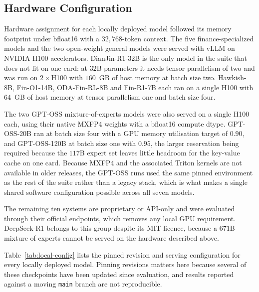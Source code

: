 
\subsection{Hardware Configuration}
\label{app:hardware}

Hardware assignment for each locally deployed model followed its memory footprint under
bfloat16 with a $32{,}768$-token context. The five finance-specialized models and the two
open-weight general models were served with vLLM on NVIDIA H100 accelerators.
DianJin-R1-32B is the only model in the suite that does not fit on one card: at $32$B
parameters it needs tensor parallelism of two and was run on $2\times$H100 with $160$~GB of
host memory at batch size two. Hawkish-8B, Fin-O1-14B, ODA-Fin-RL-8B and Fin-R1-7B each ran
on a single H100 with $64$~GB of host memory at tensor parallelism one and batch size four.

The two GPT-OSS mixture-of-experts models were also served on a single H100 each, using their
native MXFP4 weights with a bfloat16 compute dtype. GPT-OSS-20B ran at batch size four with a
GPU memory utilisation target of $0.90$, and GPT-OSS-120B at batch size one with $0.95$, the
larger reservation being required because the $117$B expert set leaves little headroom for the
key-value cache on one card. Because MXFP4 and the associated Triton kernels are not available
in older releases, the GPT-OSS runs used the same pinned environment as the rest of the suite
rather than a legacy stack, which is what makes a single shared software configuration possible
across all seven models.

The remaining ten systems are proprietary or API-only and were evaluated through their official
endpoints, which removes any local GPU requirement. DeepSeek-R1 belongs to this group despite
its MIT licence, because a $671$B mixture of experts cannot be served on the hardware described
above.

Table~\ref{tab:local-config} lists the pinned revision and serving configuration for every
locally deployed model. Pinning revisions matters here because several of these checkpoints have
been updated since evaluation, and results reported against a moving \texttt{main} branch are
not reproducible.

